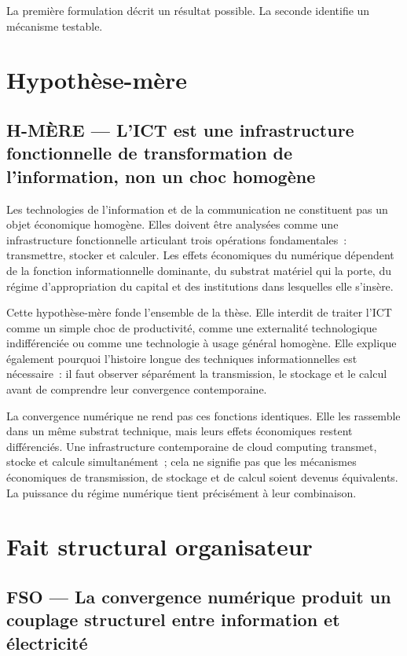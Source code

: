 La première formulation décrit un résultat possible. La seconde identifie un mécanisme testable.

\section{Hypothèse-mère}

\subsection{H-MÈRE --- L'ICT est une infrastructure fonctionnelle de transformation de l'information, non un choc homogène}

Les technologies de l'information et de la communication ne constituent pas un objet économique homogène. Elles doivent être analysées comme une infrastructure fonctionnelle articulant trois opérations fondamentales~: transmettre, stocker et calculer. Les effets économiques du numérique dépendent de la fonction informationnelle dominante, du substrat matériel qui la porte, du régime d'appropriation du capital et des institutions dans lesquelles elle s'insère.

Cette hypothèse-mère fonde l'ensemble de la thèse. Elle interdit de traiter l'ICT comme un simple choc de productivité, comme une externalité technologique indifférenciée ou comme une technologie à usage général homogène. Elle explique également pourquoi l'histoire longue des techniques informationnelles est nécessaire~: il faut observer séparément la transmission, le stockage et le calcul avant de comprendre leur convergence contemporaine.

La convergence numérique ne rend pas ces fonctions identiques. Elle les rassemble dans un même substrat technique, mais leurs effets économiques restent différenciés. Une infrastructure contemporaine de cloud computing transmet, stocke et calcule simultanément~; cela ne signifie pas que les mécanismes économiques de transmission, de stockage et de calcul soient devenus équivalents. La puissance du régime numérique tient précisément à leur combinaison.

\section{Fait structural organisateur}

\subsection{FSO --- La convergence numérique produit un couplage structurel entre information et électricité}

